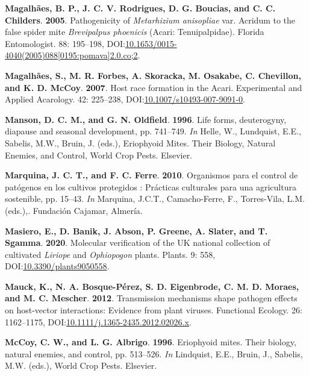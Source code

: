 \documentclass[12pt,final,CPage]{ufthesis}
\newlength{\cslhangindent}
\newenvironment{CSLReferences}[2] %
{%
	\setlength{\parindent}{0pt}
	\ifodd #1 \everypar{\setlength{\hangindent}{\cslhangindent}}\ignorespaces\fi
	\ifnum #2 > 0
	\setlength{\parskip}{#2\baselineskip}
	\fi
}%
{}
\begin{document}
{\begin{CSLReferences}{1}{0}
  \leavevmode{}%
  \textbf{Magalhães, B. P., J. C. V. Rodrigues, D. G. Boucias, and C. C. Childers}. \textbf{2005}. Pathogenicity of {\emph{Metarhizium anisopliae}} var. Acridum to the false spider mite {\emph{Brevipalpus phoenicis}} ({Acari}: {Tenuipalpidae}). Florida Entomologist. 88: 195--198, DOI:\href{https://doi.org/10.1653/0015-4040(2005)088\%5B0195:pomava\%5D2.0.co;2}{10.1653/0015-4040(2005)088{[}0195:pomava{]}2.0.co;2}.

  \leavevmode{}%
  \textbf{Magalhães, S., M. R. Forbes, A. Skoracka, M. Osakabe, C. Chevillon, and K. D. McCoy}. \textbf{2007}. Host race formation in the {Acari}. Experimental and Applied Acarology. 42: 225--238, DOI:\href{https://doi.org/10.1007/s10493-007-9091-0}{10.1007/s10493-007-9091-0}.

  \leavevmode{}%
  \textbf{Manson, D. C. M., and G. N. Oldfield}. \textbf{1996}. Life forms, deuterogyny, diapause and seasonal development, pp. 741--749. \emph{In} Helle, W., Lundquist, E.E., Sabelis, M.W., Bruin, J. (eds.), Eriophyoid Mites. Their Biology, Natural Enemies, and Control, World Crop Pests. Elsevier.

  \leavevmode{}%
  \textbf{Marquina, J. C. T., and F. C. Ferre}. \textbf{2010}. Organismos para el control de pat{ó}genos en los cultivos protegidos : Pr{á}cticas culturales para una agricultura sostenible, pp. 15--43. \emph{In} Marquina, J.C.T., Camacho-Ferre, F., Torres-Vila, L.M. (eds.),. Fundaci{ó}n Cajamar, Almer{í}a.

  \leavevmode{}%
  \textbf{Masiero, E., D. Banik, J. Abson, P. Greene, A. Slater, and T. Sgamma}. \textbf{2020}. Molecular verification of the {UK} national collection of cultivated {\emph{Liriope}} and {\emph{Ophiopogon}} plants. Plants. 9: 558, DOI:\href{https://doi.org/10.3390/plants9050558}{10.3390/plants9050558}.

  \leavevmode{}%
  \textbf{Mauck, K., N. A. Bosque-Pérez, S. D. Eigenbrode, C. M. D. Moraes, and M. C. Mescher}. \textbf{2012}. Transmission mechanisms shape pathogen effects on host-vector interactions: Evidence from plant viruses. Functional Ecology. 26: 1162--1175, DOI:\href{https://doi.org/10.1111/j.1365-2435.2012.02026.x}{10.1111/j.1365-2435.2012.02026.x}.

  \leavevmode{}%
  \textbf{McCoy, C. W., and L. G. Albrigo}. \textbf{1996}. Eriophyoid mites. Their biology, natural enemies, and control, pp. 513--526. \emph{In} Lindquist, E.E., Bruin, J., Sabelis, M.W. (eds.), World Crop Pests. Elsevier.


\end{CSLReferences}}
\end{document}
